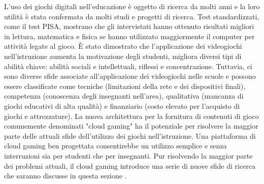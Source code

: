L'uso dei giochi digitali nell'educazione è oggetto di ricerca da molti anni e la loro utilità è stata confermata da molti studi e progetti di ricerca. Test standardizzati, come il test PISA, mostrano che gli intervistati hanno ottenuto risultati migliori in lettura, matematica e fisica se hanno utilizzato maggiormente il computer per attività legate al gioco. È stato dimostrato che l'applicazione dei videogiochi nell'istruzione aumenta la motivazione degli studenti, migliora diversi tipi di abilità chiave: abilità sociali e intellettuali, riflessi e concentrazione. Tuttavia, ci sono diverse sfide associate all'applicazione dei videogiochi nelle scuole e possono essere classificate come tecniche (limitazioni della rete e dei dispositivi finali), competenza (conoscenza degli insegnanti nell'area), qualitativa (mancanza di giochi educativi di alta qualità) e finanziario (costo elevato per l'acquisto di giochi e attrezzature). La nuova architettura per la fornitura di contenuti di gioco comunemente denominati "cloud gaming" ha il potenziale per risolvere la maggior parte delle attuali sfide dell'utilizzo dei giochi nell'istruzione. Una piattaforma di cloud gaming ben progettata consentirebbe un utilizzo semplice e senza interruzioni sia per studenti che per insegnanti. Pur risolvendo la maggior parte dei problemi attuali, il cloud gaming introduce una serie di nuove sfide di ricerca che saranno discusse in questa sezione \parencite{Use_of_Cloud_Gaming_in_Education}.





